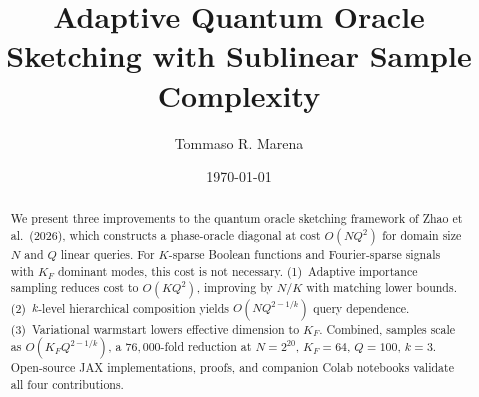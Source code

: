 \documentclass[twocolumn,prl,showpacs,preprintnumbers,amsmath,amssymb]{revtex4-2}
\begin{document}
\title{Adaptive Quantum Oracle Sketching with Sublinear Sample Complexity}

\author{Tommaso R. Marena}

\date{\today}

\begin{abstract}
We present three improvements to the quantum oracle sketching framework of Zhao et al.\ (2026), which constructs a phase-oracle diagonal at cost $O(NQ^2)$ for domain size $N$ and $Q$ linear queries.  For $K$-sparse Boolean functions and Fourier-sparse signals with $K_F$ dominant modes, this cost is not necessary.  (1)~Adaptive importance sampling reduces cost to $O(KQ^2)$, improving by $N/K$ with matching lower bounds.  (2)~$k$-level hierarchical composition yields $O(NQ^{2-1/k})$ query dependence.  (3)~Variational warmstart lowers effective dimension to $K_F$.  Combined, samples scale as $O(K_F Q^{2-1/k})$, a $76{,}000$-fold reduction at $N=2^{20}$, $K_F=64$, $Q=100$, $k=3$.  Open-source JAX implementations, proofs, and companion Colab notebooks validate all four contributions.
\end{abstract}

\maketitle












\appendix





\end{document}
